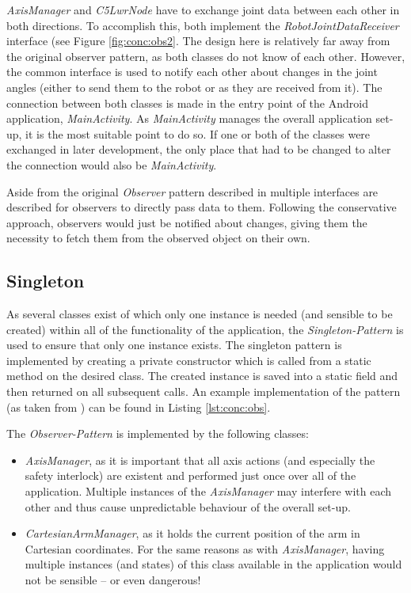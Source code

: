 \textit{AxisManager} and \textit{C5LwrNode} have to exchange joint data between each other in both directions. To accomplish this, both implement the \textit{RobotJointDataReceiver} interface (see Figure \ref{fig:conc:obs2}. The design here is relatively far away from the original observer pattern, as both classes do not know of each other. However, the common interface is used to notify each other about changes in the joint angles (either to send them to the robot or as they are received from it). The connection between both classes is made in the entry point of the Android application, \textit{MainActivity}. As \textit{MainActivity} manages the overall application set-up, it is the most suitable point to do so. If one or both of the classes were exchanged in later development, the only place that had to be changed to alter the connection would also be \textit{MainActivity}.

Aside from the original \textit{Observer} pattern described in \cite{Eilebrecht2013} multiple interfaces are described for observers to directly pass data to them. Following the conservative approach, observers would just be notified about changes, giving them the necessity to fetch them from the observed object on their own.

\subsection{Singleton}

As several classes exist of which only one instance is needed (and sensible to be created) within all of the functionality of the application, the \textit{Singleton-Pattern} is used to ensure that only one instance exists. The singleton pattern is implemented by creating a private constructor which is called from a static method on the desired class. The created instance is saved into a static field and then returned on all subsequent calls. An example implementation of the pattern (as taken from \cite{Eilebrecht2013}) can be found in Listing \ref{lst:conc:obs}.

The \textit{Observer-Pattern} is implemented by the following classes:
\begin{itemize}
	\item \textit{AxisManager}, as it is important that all axis actions (and especially the safety interlock) are existent and performed just once over all of the application. Multiple instances of the \textit{AxisManager} may interfere with each other and thus cause unpredictable behaviour of the overall set-up.
	\item \textit{CartesianArmManager}, as it holds the current position of the arm in Cartesian coordinates. For the same reasons as with \textit{AxisManager}, having multiple instances (and states) of this class available in the application would not be sensible -- or even dangerous!
\end{itemize}

